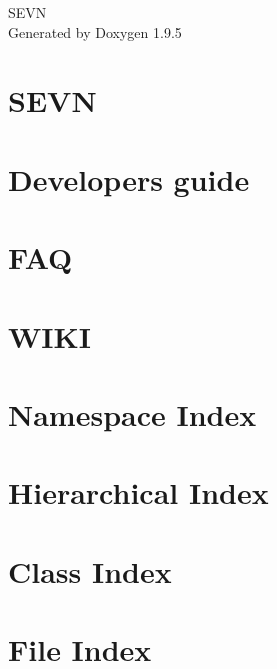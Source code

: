 \documentclass[twoside]{book}
\newcommand{\+}{\discretionary{\mbox{\scriptsize$\hookleftarrow$}}{}{}}
\newcommand{\clearemptydoublepage}{%
    \newpage{\pagestyle{empty}\cleardoublepage}%
  }
\begin{document}
  \raggedbottom
    \hypersetup{pageanchor=false,
                bookmarksnumbered=true,
                pdfencoding=unicode
               }
  \begin{titlepage}
  \vspace*{7cm}
  \begin{center}%
  {\Large SEVN}\\
  \vspace*{1cm}
  {\large Generated by Doxygen 1.9.5}\\
  \end{center}
  \end{titlepage}
  \clearemptydoublepage
  \tableofcontents
  \clearemptydoublepage
  \hypersetup{pageanchor=true}
\chapter{SEVN}
\label{index}\hypertarget{index}{}
\chapter{Developers guide}
\label{md_devepguide}

\chapter{FAQ}
\label{md__f_a_q}

\chapter{WIKI}
\label{md__wiki}

\chapter{Namespace Index}

\chapter{Hierarchical Index}

\chapter{Class Index}

\chapter{File Index}

\end{document}
